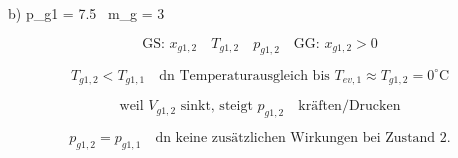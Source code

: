 b) \quad {} p_{g1} = 7.5 \,  m_g = 3 \,  

\[
\text{GS: } x_{g1,2} \quad T_{g1,2} \quad p_{g1,2} \quad \text{GG: } x_{g1,2} > 0
\]


\[
T_{g1,2} < T_{g1,1} \quad \text{dn Temperaturausgleich bis } T_{ev,1} \approx T_{g1,2} = 0^\circ \text{C}
\]

\[
\text{weil } V_{g1,2} \text{ sinkt, steigt } p_{g1,2} \quad \text{kräften/Drucken}
\]

\[
p_{g1,2} = p_{g1,1} \quad \text{dn keine zusätzlichen Wirkungen bei Zustand 2.}
\]